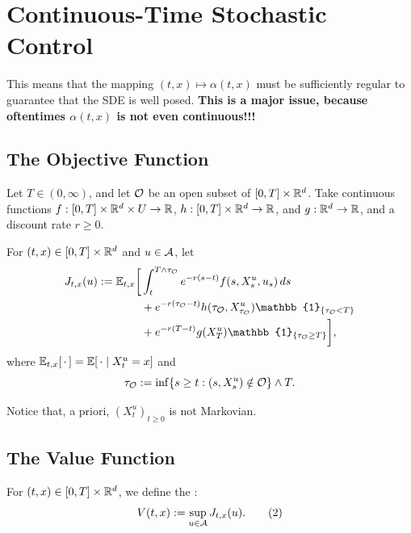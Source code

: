 \section{Continuous-Time Stochastic Control}

\begin{remark}
    This means that the mapping $(t,x) \mapsto \alpha(t,x)$ must be sufficiently regular to guarantee that the SDE is well posed. \textbf{\color{red}This is a major issue, because oftentimes $\alpha(t,x)$ is not even continuous!!!}
\end{remark}

\subsection{The Objective Function}

Let $T \in (0, \infty)$, and let $\mathcal{O}$ be an open subset of $[0,T] \times \mathbb R^d$. Take continuous functions $f: [0,T] \times \mathbb R^d \times U \to \mathbb R$, $h: [0,T] \times \mathbb R^d \to \mathbb R$, and $g: \mathbb R^d \to \mathbb R$, and a discount rate $r \geq 0$. 

For $(t,x) \in [0,T] \times \mathbb R^d$ and $u \in \mathcal{A}$, let
\begin{align*}
    J_{t,x}(u) := \EE_{t,x} \bigg[ &\int_t^{T \wedge \tau_{\mc{O}}} e^{-r(s-t)} f(s, X_s^u, u_s) \, ds \\
    &+ e^{-r(\tau_{\mc{O}}-t)} h(\tau_{\mc{O}}, X_{\tau_{\mc{O}}}^u) \mathbb{1}_{\{\tau_{\mc{O}} < T\}} \\
    &+ e^{-r(T-t)} g(X_T^u) \mathbb{1}_{\{\tau_{\mc{O}} \geq T\}} \bigg],
\end{align*}
where $\mathbb E_{t,x}[\,\cdot\,] = \mathbb E[\,\cdot \mid X_t^u = x]$ and 
\[ \tau_{\mathcal{O}} := \inf \{ s \geq t : (s, X_s^u) \notin \mathcal{O} \} \wedge T. \]

\begin{remark}
    Notice that, a priori, $(X_t^u)_{t \geq 0}$ is not Markovian.
\end{remark}

\subsection{The Value Function}

\begin{definition}
    For $(t,x) \in [0,T] \times \mathbb R^d$, we define the :
    \begin{equation}
        V(t,x) := \sup_{u \in \mathcal{A}} J_{t,x}(u). \tag{2}
    \end{equation}
\end{definition}

